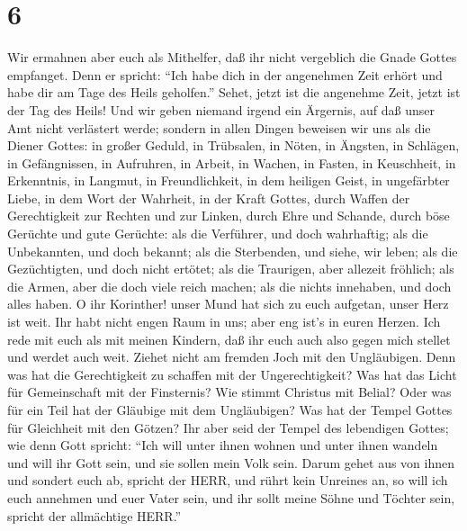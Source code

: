 \hypertarget{section-5}{%
\section{6}\label{section-5}}

 Wir ermahnen aber euch als Mithelfer, daß ihr nicht
vergeblich die Gnade Gottes empfanget.  Denn er spricht:
``Ich habe dich in der angenehmen Zeit erhört und habe dir am Tage des
Heils geholfen.'' Sehet, jetzt ist die angenehme Zeit, jetzt ist der Tag
des Heils!  Und wir geben niemand irgend ein Ärgernis, auf
daß unser Amt nicht verlästert werde;  sondern in allen
Dingen beweisen wir uns als die Diener Gottes: in großer Geduld, in
Trübsalen, in Nöten, in Ängsten,  in Schlägen, in
Gefängnissen, in Aufruhren, in Arbeit, in Wachen, in Fasten,
 in Keuschheit, in Erkenntnis, in Langmut, in
Freundlichkeit, in dem heiligen Geist, in ungefärbter Liebe,
 in dem Wort der Wahrheit, in der Kraft Gottes, durch Waffen
der Gerechtigkeit zur Rechten und zur Linken,  durch Ehre
und Schande, durch böse Gerüchte und gute Gerüchte: als die Verführer,
und doch wahrhaftig;  als die Unbekannten, und doch bekannt;
als die Sterbenden, und siehe, wir leben; als die Gezüchtigten, und doch
nicht ertötet;  als die Traurigen, aber allezeit fröhlich;
als die Armen, aber die doch viele reich machen; als die nichts
innehaben, und doch alles haben.  O ihr Korinther! unser
Mund hat sich zu euch aufgetan, unser Herz ist weit.  Ihr
habt nicht engen Raum in uns; aber eng ist's in euren Herzen.
 Ich rede mit euch als mit meinen Kindern, daß ihr euch
auch also gegen mich stellet und werdet auch weit.  Ziehet
nicht am fremden Joch mit den Ungläubigen. Denn was hat die
Gerechtigkeit zu schaffen mit der Ungerechtigkeit? Was hat das Licht für
Gemeinschaft mit der Finsternis?  Wie stimmt Christus mit
Belial? Oder was für ein Teil hat der Gläubige mit dem Ungläubigen?
 Was hat der Tempel Gottes für Gleichheit mit den Götzen?
Ihr aber seid der Tempel des lebendigen Gottes; wie denn Gott spricht:
``Ich will unter ihnen wohnen und unter ihnen wandeln und will ihr Gott
sein, und sie sollen mein Volk sein.  Darum gehet aus von
ihnen und sondert euch ab, spricht der HERR, und rührt kein Unreines an,
so will ich euch annehmen  und euer Vater sein, und ihr
sollt meine Söhne und Töchter sein, spricht der allmächtige HERR.''

